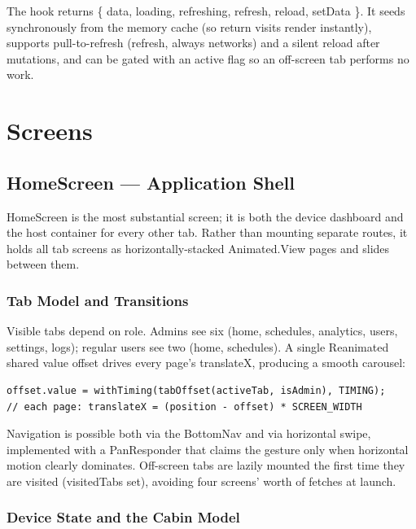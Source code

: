\documentclass[11pt,a4paper]{article}
\newcommand{\code}[1]{\colorbox{codebg}{\ttfamily\small #1}}
\begin{document}
The hook returns \code{\{ data, loading, refreshing, refresh, reload, setData
\}}. It seeds synchronously from the memory cache (so return visits render
instantly), supports pull-to-refresh (\code{refresh}, always networks) and a
silent \code{reload} after mutations, and can be gated with an \code{active}
flag so an off-screen tab performs no work.

\section{Screens}

\subsection{HomeScreen — Application Shell}
\label{sec:home}

\code{HomeScreen} is the most substantial screen; it is both the device
dashboard and the host container for every other tab. Rather than mounting
separate routes, it holds all tab screens as horizontally-stacked
\code{Animated.View} pages and slides between them.

\subsubsection{Tab Model and Transitions}

Visible tabs depend on role. Admins see six
(\code{home, schedules, analytics, users, settings, logs}); regular users see
two (\code{home, schedules}). A single Reanimated shared value \code{offset}
drives every page's \code{translateX}, producing a smooth carousel:

\begin{lstlisting}[language=tsx]
offset.value = withTiming(tabOffset(activeTab, isAdmin), TIMING);
// each page: translateX = (position - offset) * SCREEN_WIDTH
\end{lstlisting}

Navigation is possible both via the \code{BottomNav} and via horizontal swipe,
implemented with a \code{PanResponder} that claims the gesture only when
horizontal motion clearly dominates. Off-screen tabs are lazily mounted the
first time they are visited (\code{visitedTabs} set), avoiding four screens'
worth of fetches at launch.

\subsubsection{Device State and the Cabin Model}
\end{document}
